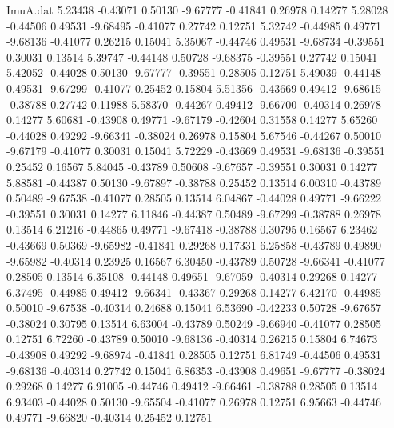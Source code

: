 \begin{filecontents}{ImuA.dat}
   5.23438   -0.43071    0.50130   -9.67777   -0.41841    0.26978    0.14277
   5.28028   -0.44506    0.49531   -9.68495   -0.41077    0.27742    0.12751
   5.32742   -0.44985    0.49771   -9.68136   -0.41077    0.26215    0.15041
   5.35067   -0.44746    0.49531   -9.68734   -0.39551    0.30031    0.13514
   5.39747   -0.44148    0.50728   -9.68375   -0.39551    0.27742    0.15041
   5.42052   -0.44028    0.50130   -9.67777   -0.39551    0.28505    0.12751
   5.49039   -0.44148    0.49531   -9.67299   -0.41077    0.25452    0.15804
   5.51356   -0.43669    0.49412   -9.68615   -0.38788    0.27742    0.11988
   5.58370   -0.44267    0.49412   -9.66700   -0.40314    0.26978    0.14277
   5.60681   -0.43908    0.49771   -9.67179   -0.42604    0.31558    0.14277
   5.65260   -0.44028    0.49292   -9.66341   -0.38024    0.26978    0.15804
   5.67546   -0.44267    0.50010   -9.67179   -0.41077    0.30031    0.15041
   5.72229   -0.43669    0.49531   -9.68136   -0.39551    0.25452    0.16567
   5.84045   -0.43789    0.50608   -9.67657   -0.39551    0.30031    0.14277
   5.88581   -0.44387    0.50130   -9.67897   -0.38788    0.25452    0.13514
   6.00310   -0.43789    0.50489   -9.67538   -0.41077    0.28505    0.13514
   6.04867   -0.44028    0.49771   -9.66222   -0.39551    0.30031    0.14277
   6.11846   -0.44387    0.50489   -9.67299   -0.38788    0.26978    0.13514
   6.21216   -0.44865    0.49771   -9.67418   -0.38788    0.30795    0.16567
   6.23462   -0.43669    0.50369   -9.65982   -0.41841    0.29268    0.17331
   6.25858   -0.43789    0.49890   -9.65982   -0.40314    0.23925    0.16567
   6.30450   -0.43789    0.50728   -9.66341   -0.41077    0.28505    0.13514
   6.35108   -0.44148    0.49651   -9.67059   -0.40314    0.29268    0.14277
   6.37495   -0.44985    0.49412   -9.66341   -0.43367    0.29268    0.14277
   6.42170   -0.44985    0.50010   -9.67538   -0.40314    0.24688    0.15041
   6.53690   -0.42233    0.50728   -9.67657   -0.38024    0.30795    0.13514
   6.63004   -0.43789    0.50249   -9.66940   -0.41077    0.28505    0.12751
   6.72260   -0.43789    0.50010   -9.68136   -0.40314    0.26215    0.15804
   6.74673   -0.43908    0.49292   -9.68974   -0.41841    0.28505    0.12751
   6.81749   -0.44506    0.49531   -9.68136   -0.40314    0.27742    0.15041
   6.86353   -0.43908    0.49651   -9.67777   -0.38024    0.29268    0.14277
   6.91005   -0.44746    0.49412   -9.66461   -0.38788    0.28505    0.13514
   6.93403   -0.44028    0.50130   -9.65504   -0.41077    0.26978    0.12751
   6.95663   -0.44746    0.49771   -9.66820   -0.40314    0.25452    0.12751

\end{filecontents}
